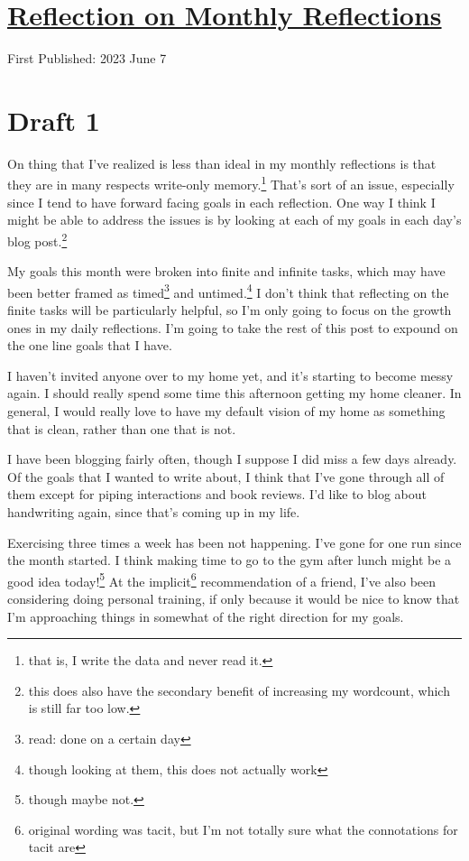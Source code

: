 \documentclass[12pt]{article}[titlepage]
\renewcommand{\,}{\textsuperscript{,}}
\begin{document}
\doublespacing
\section{\href{reflection-monthly-reflection.html}{Reflection on Monthly Reflections}}
First Published: 2023 June 7

\section{Draft 1}
On thing that I've realized is less than ideal in my monthly reflections is that they are in many respects write-only memory.\footnote{that is, I write the data and never read it.}
That's sort of an issue, especially since I tend to have forward facing goals in each reflection.
One way I think I might be able to address the issues is by looking at each of my goals in each day's blog post.\footnote{this does also have the secondary benefit of increasing my wordcount, which is still far too low.}

My goals this month were broken into finite and infinite tasks, which may have been better framed as timed\footnote{read: done on a certain day} and untimed.\footnote{though looking at them, this does not actually work}
I don't think that reflecting on the finite tasks will be particularly helpful, so I'm only going to focus on the growth ones in my daily reflections.
I'm going to take the rest of this post to expound on the one line goals that I have.

I haven't invited anyone over to my home yet, and it's starting to become messy again.
I should really spend some time this afternoon getting my home cleaner.
In general, I would really love to have my default vision of my home as something that is clean, rather than one that is not.

I have been blogging fairly often, though I suppose I did miss a few days already.
Of the goals that I wanted to write about, I think that I've gone through all of them except for piping interactions and book reviews.
I'd like to blog about handwriting again, since that's coming up in my life.

Exercising three times a week has been not happening.
I've gone for one run since the month started.
I think making time to go to the gym after lunch might be a good idea today!\footnote{though maybe not.}
At the implicit\footnote{original wording was tacit, but I'm not totally sure what the connotations for tacit are} recommendation of a friend, I've also been considering doing personal training, if only because it would be nice to know that I'm approaching things in somewhat of the right direction for my goals.
\end{document}
